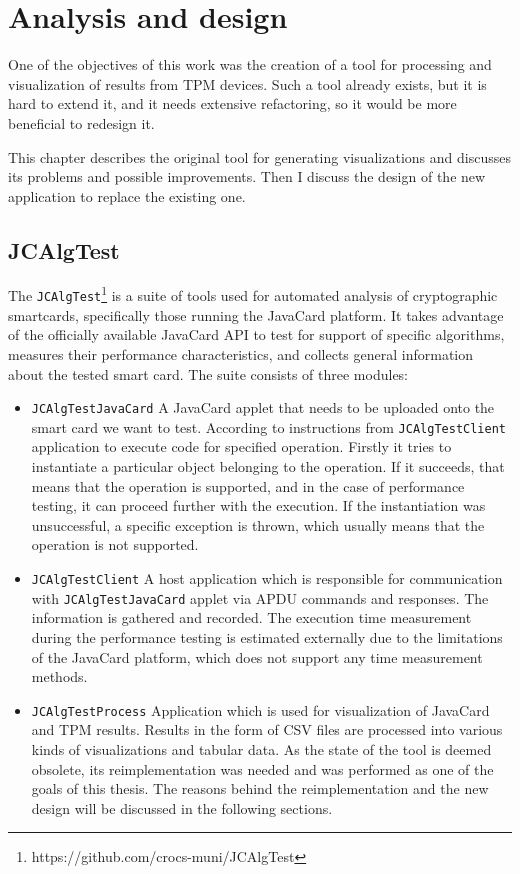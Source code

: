 \chapter{Analysis and design}
One of the objectives of this work was the creation of a tool for processing and visualization of results from TPM devices. Such a tool already exists, but it is hard to extend it, and it needs extensive refactoring, so it would be more beneficial to redesign it.

This chapter describes the original tool for generating visualizations and discusses its problems and possible improvements. Then I discuss the design of the new application to replace the existing one.

\section{JCAlgTest}
The \texttt{JCAlgTest}\footnote{https://github.com/crocs-muni/JCAlgTest} is a suite of tools used for automated analysis of cryptographic smartcards, specifically those running the JavaCard platform. It takes advantage of the officially available JavaCard API to test for support of specific algorithms, measures their performance characteristics, and collects general information about the tested smart card. The suite consists of three modules:
\begin{itemize}
  \item
        \texttt{JCAlgTestJavaCard} A JavaCard applet that needs to be uploaded onto the smart card we want to test. According to instructions from \texttt{JCAlgTestClient} application to execute code for specified operation. Firstly it tries to instantiate a particular object belonging to the operation. If it succeeds, that means that the operation is supported, and in the case of performance testing, it can proceed further with the execution. If the instantiation was unsuccessful, a specific exception is thrown, which usually means that the operation is not supported.
  \item
        \texttt{JCAlgTestClient} A host application which is responsible for communication with \texttt{JCAlgTestJavaCard} applet via APDU commands and responses. The information is gathered and recorded. The execution time measurement during the performance testing  is estimated externally due to the limitations of the JavaCard platform, which does not support any time measurement methods.
  \item
        \texttt{JCAlgTestProcess} Application which is used for visualization of JavaCard and TPM results. Results in the form of CSV files are processed into various kinds of visualizations and tabular data. As the state of the tool is deemed obsolete, its reimplementation was needed and was performed as one of the goals of this thesis. The reasons behind the reimplementation and the new design will be discussed in the following sections.
\end{itemize}

